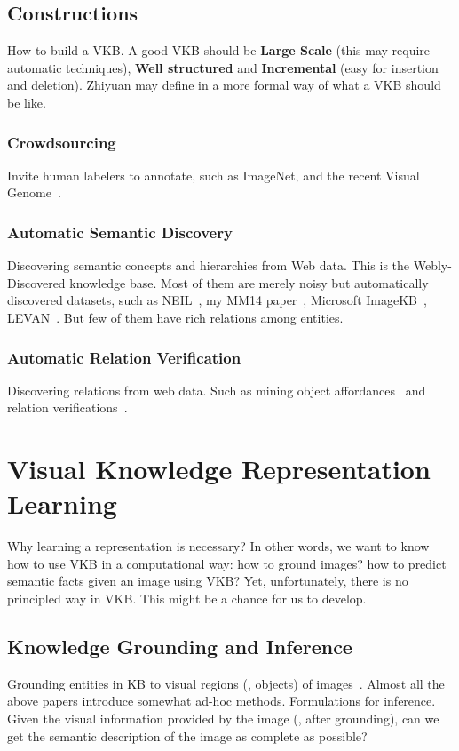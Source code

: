 \subsection{Constructions}\label{sec:4_2}
How to build a VKB. A good VKB should be \textbf{Large Scale} (this may require automatic techniques), \textbf{Well structured} and \textbf{Incremental} (easy for insertion and deletion). Zhiyuan may define in a more formal way of what a VKB should be like.
\subsubsection{Crowdsourcing}\label{sec:4_2_1}
Invite human labelers to annotate, such as ImageNet, and the recent Visual Genome~\cite{krishna2016visual}.

\subsubsection{Automatic Semantic Discovery}\label{sec:4_2_2}
Discovering semantic concepts and hierarchies from Web data. This is the Webly-Discovered knowledge base. Most of them are merely noisy but automatically discovered datasets, such as NEIL~\cite{chen2013neil,chen2015webly}, my MM14 paper~\cite{zhang2014start}, Microsoft ImageKB~\cite{wang2012towards}, LEVAN~\cite{divvala2014learning}. But few of them have rich relations among entities.

\subsubsection{Automatic Relation Verification}\label{sec:4_2_3}
Discovering relations from web data. Such as mining object affordances~\cite{zhu2014reasoning,chao2015mining} and relation verifications~\cite{vedantam2015learning,sadeghi2015viske}. 


\section{Visual Knowledge Representation Learning}\label{sec:5}
Why learning a representation is necessary? In other words, we want to know how to use VKB in a computational way: how to ground images? how to predict semantic facts given an image using VKB? Yet, unfortunately, there is no principled way in VKB. This might be a chance for us to develop.
\subsection{Knowledge Grounding and Inference}
Grounding entities in KB to visual regions (\eg, objects) of images~\cite{johnson2015image}. Almost all the above papers introduce somewhat ad-hoc methods. Formulations for inference. Given the visual information provided by the image (\ie, after grounding), can we get the semantic description of the image as complete as possible?

